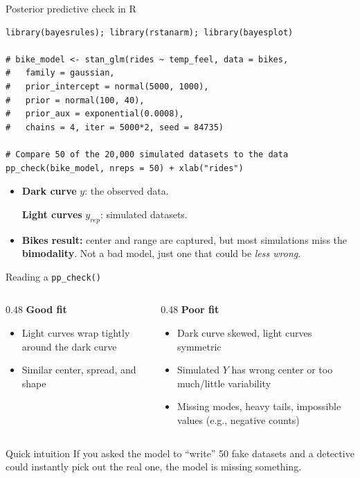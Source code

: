 \documentclass[aspectratio=43,11pt]{beamer}
\begin{document}
{\begin{frame}[fragile]{Posterior predictive check in R}
\begin{lstlisting}
library(bayesrules); library(rstanarm); library(bayesplot)

# bike_model <- stan_glm(rides ~ temp_feel, data = bikes,
#   family = gaussian,
#   prior_intercept = normal(5000, 1000),
#   prior = normal(100, 40),
#   prior_aux = exponential(0.0008),
#   chains = 4, iter = 5000*2, seed = 84735)

# Compare 50 of the 20,000 simulated datasets to the data
pp_check(bike_model, nreps = 50) + xlab("rides")
\end{lstlisting}
  \begin{itemize}
    \item \textbf{Dark curve} $y$: the observed data.\par
    \textbf{Light curves} $y_{rep}$: simulated datasets.
    \item \textbf{Bikes result:} center and range are captured, but most simulations miss the \textbf{bimodality}. Not a bad model, just one that could be \emph{less wrong}.
  \end{itemize}
\end{frame}

\begin{frame}{Reading a \texttt{pp\_check()}}
  \begin{columns}[T]
    \begin{column}{0.48\textwidth}
      \textbf{Good fit}
      \begin{itemize}
        \item Light curves wrap tightly around the dark curve
        \item Similar center, spread, and shape
      \end{itemize}
    \end{column}
    \begin{column}{0.48\textwidth}
      \textbf{Poor fit}
      \begin{itemize}
        \item Dark curve skewed, light curves symmetric
        \item Simulated $Y$ has wrong center or too much/little variability
        \item Missing modes, heavy tails, impossible values (e.g., negative counts)
      \end{itemize}
    \end{column}
  \end{columns}
  \vspace{0.6em}
  \begin{exampleblock}{Quick intuition}
    If you asked the model to ``write'' 50 fake datasets and a detective could instantly pick out the real one, the model is missing something.
  \end{exampleblock}
\end{frame}

}
\end{document}
